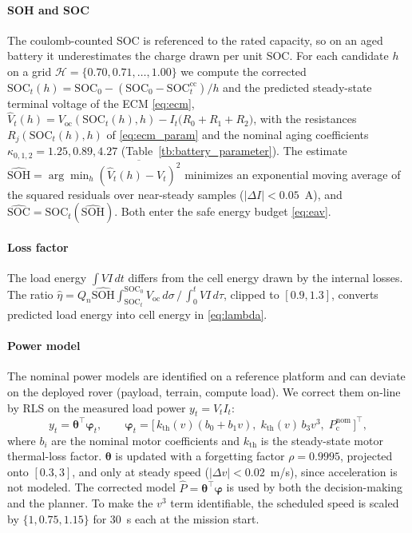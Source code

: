 \paragraph{SOH and SOC}
The coulomb-counted \ac{SOC} is referenced to the rated capacity, so on an aged battery it
underestimates the charge drawn per unit \ac{SOC}. For each candidate $h$ on a grid
$\mathcal{H} = \{0.70, 0.71, \dots, 1.00\}$ we compute the corrected
$\mathrm{SOC}_t(h) = \mathrm{SOC}_0 - (\mathrm{SOC}_0 - \mathrm{SOC}_t^{\mathrm{cc}})/h$ and the
predicted steady-state terminal voltage of the \ac{ECM} \eqref{eq:ecm},
$\hat V_t(h) = V_{\mathrm{oc}}(\mathrm{SOC}_t(h), h) - I_t\big(R_0 + R_1 + R_2\big)$,
with the resistances $R_j(\mathrm{SOC}_t(h), h)$ of \eqref{eq:ecm_param} and the nominal aging coefficients
$\kappa_{0,1,2} = 1.25, 0.89, 4.27$ (Table~\ref{tb:battery_parameter}). The estimate
$\widehat{\mathrm{SOH}} = \arg\min_h \overline{(\hat V_t(h) - V_t)^2}$ minimizes an exponential
moving average of the squared residuals over near-steady samples
($|\Delta I| < 0.05$~A), and $\widehat{\mathrm{SOC}} = \mathrm{SOC}_t(\widehat{\mathrm{SOH}})$.
Both enter the safe energy budget \eqref{eq:eav}.

\paragraph{Loss factor}
The load energy $\int V I\, dt$ differs from the cell energy drawn by the internal losses.
The ratio
$\hat\eta = Q_n \widehat{\mathrm{SOH}} \int_{\mathrm{SOC}_t}^{\mathrm{SOC}_0} V_{\mathrm{oc}}\, d\sigma \,/\, \int_0^t V I\, d\tau$,
clipped to $[0.9, 1.3]$, converts predicted load energy into cell energy in \eqref{eq:lambda}.

\paragraph{Power model}
The nominal power models are identified on a reference platform and can deviate on the
deployed rover (payload, terrain, compute load). We correct them on-line by \ac{RLS} on the
measured load power $y_t = V_t I_t$:
\begin{equation}
  y_t = \boldsymbol\theta^\top \boldsymbol\varphi_t,\qquad
  \boldsymbol\varphi_t = \big[\, k_{\mathrm{th}}(v)(b_0 + b_1 v),\;
                          k_{\mathrm{th}}(v)\, b_3 v^3,\;
                          P_{\mathrm{c}}^{\mathrm{nom}} \,\big]^\top,
  \label{eq:rls}
\end{equation}
where $b_i$ are the nominal motor coefficients and $k_{\mathrm{th}}$ is the steady-state
motor thermal-loss factor. $\boldsymbol\theta$ is updated with a forgetting factor
$\rho = 0.9995$, projected onto $[0.3, 3]$, and only at steady speed ($|\Delta v| < 0.02$~m/s),
since acceleration is not modeled. The corrected model $\hat P = \boldsymbol\theta^\top \boldsymbol\varphi$
is used by both the decision-making and the planner. To make the $v^3$ term identifiable, the
scheduled speed is scaled by $\{1, 0.75, 1.15\}$ for 30~s each at the mission start.

